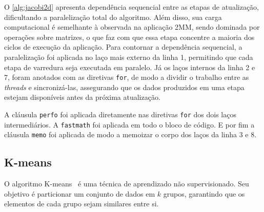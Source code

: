 O \autoref{alg:jacobi2d} apresenta dependência sequencial entre as etapas de atualização, dificultando a paralelização total do algoritmo. Além disso, sua carga computacional é semelhante à observada na aplicação 2MM, sendo dominada por operações sobre matrizes, o que faz com que essa etapa concentre a maioria dos ciclos de execução da aplicação. Para contornar a dependência sequencial, a paralelização foi aplicada no laço mais externo da linha 1, permitindo que cada etapa de varredura seja executada em paralelo. Já os laços internos da linha 2 e 7, foram anotados com as diretivas \texttt{for}, de modo a dividir o trabalho entre as \textit{threads} e sincronizá-las, assegurando que os dados produzidos em uma etapa estejam disponíveis antes da próxima atualização.

A cláusula \texttt{perfo} foi aplicada diretamente nas diretivas \texttt{for} dos dois laços intermediários. A \texttt{fastmath} foi aplicada em todo o bloco de código. E por fim a cláusula \texttt{memo} foi aplicada de modo a memoizar o corpo dos laços da linha 3 e 8.

\subsection{K-means}\label{subsec:kmeans}

O algoritmo K-means~\cite{macqueen1967} é uma técnica de aprendizado não supervisionado. Seu objetivo é particionar um conjunto de dados em $k$ grupos, garantindo que os elementos de cada grupo sejam similares entre si.

